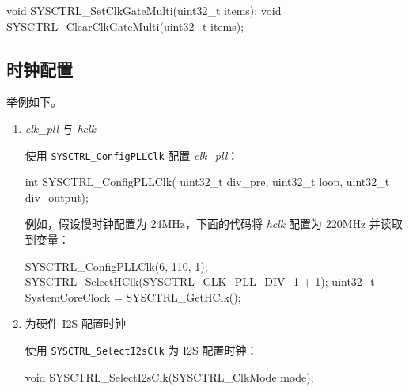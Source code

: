 \documentclass[
  12pt,
]{book}
\newenvironment{Shaded}{\begin{snugshade}}{\end{snugshade}}
\newcommand{\DataTypeTok}[1]{\textcolor[rgb]{0.13,0.29,0.53}{#1}}
\newcommand{\DecValTok}[1]{\textcolor[rgb]{0.00,0.00,0.81}{#1}}
\newcommand{\NormalTok}[1]{#1}
\begin{document}
\begin{Shaded}
\begin{Highlighting}[]
\DataTypeTok{void}\NormalTok{ SYSCTRL_SetClkGateMulti(}\DataTypeTok{uint32_t}\NormalTok{ items);}
\DataTypeTok{void}\NormalTok{ SYSCTRL_ClearClkGateMulti(}\DataTypeTok{uint32_t}\NormalTok{ items);}
\end{Highlighting}
\end{Shaded}

\hypertarget{ux65f6ux949fux914dux7f6e-2}{%
\subsection{时钟配置}\label{ux65f6ux949fux914dux7f6e-2}}

举例如下。

\begin{enumerate}
\def\labelenumi{\arabic{enumi}.}
\item
  \emph{clk\_pll} 与 \emph{hclk}

  使用 \texttt{SYSCTRL\_ConfigPLLClk} 配置 \emph{clk\_pll}：

\begin{Shaded}
\begin{Highlighting}[]
\DataTypeTok{int}\NormalTok{ SYSCTRL_ConfigPLLClk(}
\DataTypeTok{uint32_t}\NormalTok{ div_pre,}
\DataTypeTok{uint32_t}\NormalTok{ loop,}
\DataTypeTok{uint32_t}\NormalTok{ div_output);}
\end{Highlighting}
\end{Shaded}

  例如，假设慢时钟配置为 24MHz，下面的代码将 \emph{hclk} 配置为 220MHz 并读取到变量：

\begin{Shaded}
\begin{Highlighting}[]
\NormalTok{SYSCTRL_ConfigPLLClk(}\DecValTok{6}\NormalTok{, }\DecValTok{110}\NormalTok{, }\DecValTok{1}\NormalTok{);}
\NormalTok{SYSCTRL_SelectHClk(SYSCTRL_CLK_PLL_DIV_1 + }\DecValTok{1}\NormalTok{);}
\DataTypeTok{uint32_t}\NormalTok{ SystemCoreClock = SYSCTRL_GetHClk();}
\end{Highlighting}
\end{Shaded}
\item
  为硬件 I2S 配置时钟

  使用 \texttt{SYSCTRL\_SelectI2sClk} 为 I2S 配置时钟：

\begin{Shaded}
\begin{Highlighting}[]
\DataTypeTok{void}\NormalTok{ SYSCTRL_SelectI2sClk(SYSCTRL_ClkMode mode);}
\end{Highlighting}
\end{Shaded}


\end{enumerate}
\end{document}
